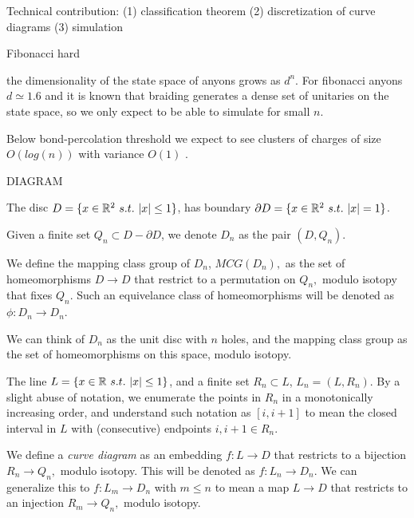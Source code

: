 \documentclass[11pt,a4paper]{article}
\begin{document}
Technical contribution: 
(1) classification theorem
(2) discretization of curve diagrams
(3) simulation



Fibonacci hard


the dimensionality of the state space
of anyons grows as $d^n$.
For fibonacci anyons $d\simeq 1.6$ and
it is known that braiding generates a dense
set of unitaries on the state space, so we
only expect to be able to simulate for small $n.$

Below bond-percolation threshold we expect to see clusters
of charges of size $O(log(n))$ with variance $O(1)$ \cite{Bazant00}.

DIAGRAM



The disc $D = \{ x\in \mathR^2\ s.t.\ |x|\leq 1 \} $,
has boundary $\partial D = \{ x\in \mathbb{R}^2\ s.t.\ |x|=1 \} $.

Given a finite set $ Q_n \subset D-\partial D$,
we denote $D_n$ as the pair $(D, Q_n).$

We define the mapping class group of $D_n$,
$MCG(D_n),$ as the set of homeomorphisms $D\to D$ that
restrict to a permutation on $Q_n,$ modulo isotopy that
fixes $Q_n.$
Such an equivelance class
of homeomorphisms will be denoted as $\phi:D_n\to D_n.$

We can think of $D_n$ as the unit disc with $n$ holes,
and the mapping class group as the set of homeomorphisms on
this space, modulo isotopy.

The line $L = \{ x\in \mathbb{R}\ s.t.\ |x|\leq 1 \} $,
and a finite set $R_n\subset L$,
$L_n = (L, R_n).$
By a slight abuse of notation, we enumerate the points in $R_n$ 
in a monotonically increasing order,
and understand such notation as $[i, i+1]$ to mean the closed interval in $L$
with (consecutive) endpoints $i, i+1 \in R_n.$

We define a {\it curve diagram} as an embedding $f : L\to D$ that
restricts to a bijection $R_n\to Q_n,$ modulo
isotopy.
This will be denoted as $f : L_n\to D_n.$
We can generalize this to $f : L_m\to D_n$ with $m\leq n$
to mean a map $L\to D$ that restricts to an injection $R_m\to Q_n,$
modulo isotopy.
\end{document}
